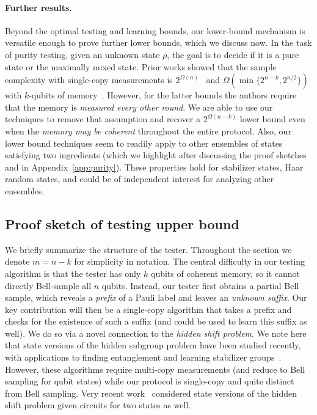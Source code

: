 \documentclass[11pt]{article}
\begin{document}
\paragraph{Further results.} Beyond the optimal testing and learning bounds, our lower-bound mechanism is versatile enough to prove further lower bounds, which we discuss now. In the task of purity testing,  given an unknown state $\rho$, the goal is to decide if it is a pure state or the maximally mixed state. Prior works showed that the sample complexity with single-copy measurements is $2^{\Omega(n)}$~\cite{chen2022exponential} and $\Omega(\min\{2^{n-k}, 2^{n/2}\})$ with $k$-qubits of memory~\cite{chen2024optimal, gong2024sample}. However, for the latter bounds the authors require that the memory is \emph{measured} \emph{every other round}. We are able to use our techniques to remove that assumption and recover a $2^{\Omega(n-k)}$ lower bound even when the \emph{memory may be coherent} throughout the entire protocol. Also, our lower bound techniques seem to readily apply to other ensembles of states satisfying two ingredients (which we highlight after discussing the proof sketches and in Appendix~\ref{app:purity}). These properties hold for stabilizer states, Haar random states, and could be of independent interest for analyzing other ensembles.

\subsection{Proof sketch of testing upper bound}

We briefly summarize the structure of the tester.  Throughout the section we denote $m=n-k$ for simplicity in notation.   The central
difficulty in our testing algorithm is that the tester has only $k$ qubits of coherent memory, so it
cannot directly Bell-sample all $n$ qubits. Instead, our tester first obtains a partial Bell sample, which reveals a \emph{prefix} of a Pauli label and leaves an
\emph{unknown suffix}. Our key contribution will then be a single-copy algorithm that takes a prefix and checks for the existence of such a suffix (and could be used to learn this suffix as well). We do so via a novel connection to the \emph{hidden shift problem}. We note here that state versions of the hidden subgroup problem have been studied recently, with applications to finding entanglement and learning stabilizer groups~\cite{bouland2025state, hinsche2026abelian}. However, these algorithms require multi-copy measurements (and reduce to Bell sampling for qubit states) while our protocol is single-copy and quite distinct from Bell sampling. Very recent work~\cite{gheorghiu2026quantum} considered state versions of the hidden shift problem given circuits for two states as well.
\end{document}
